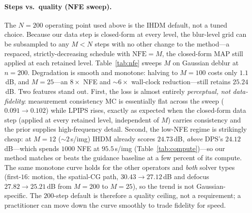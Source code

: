 \documentclass[11pt]{article}
\begin{document}
\paragraph{Steps vs.\ quality (NFE sweep).}
The $N{=}200$ operating point used above is the IHDM default, not a tuned choice. Because our data
step is closed-form at every level, the blur-level grid can be subsampled to any $M<N$ steps with no
other change to the method---a respaced, strictly-decreasing schedule with $\text{NFE}{=}M$, the
closed-form MAP still applied at each retained level. Table~\ref{tab:nfe} sweeps $M$ on Gaussian
deblur at $n{=}200$. Degradation is smooth and monotone: halving to $M{=}100$ costs only $1.1$\,dB,
and $M{=}25$---an $8\times$ NFE and $\sim\!6\times$ wall-clock reduction---still retains $25.24$\,dB.
Two features stand out. First, the loss is almost entirely \emph{perceptual, not data-fidelity}:
measurement consistency MC is essentially flat across the sweep ($0.091\!\rightarrow\!0.102$) while
LPIPS rises, exactly as expected when the closed-form data step (applied at every retained level,
independent of $M$) carries consistency and the prior supplies high-frequency detail. Second, the
low-NFE regime is strikingly cheap: at $M{=}12$ ($\sim\!2$\,s/img) IHDM already scores $24.73$\,dB,
\emph{above} DPS's $24.12$\,dB---which spends $1000$ NFE at $95.5$\,s/img (Table~\ref{tab:compute})---so
our method matches or beats the guidance baseline at a few percent of its compute. The same monotone
curve holds for the other operators and \emph{both} solver types (first-$16$: motion, the spatial-CG
path, $30.43\!\rightarrow\!27.12$\,dB and defocus $27.82\!\rightarrow\!25.21$\,dB from $M{=}200$ to
$M{=}25$), so the trend is not Gaussian-specific. The $200$-step default is therefore a quality
ceiling, not a requirement; a practitioner can move down the curve smoothly to trade fidelity for speed.
\end{document}

